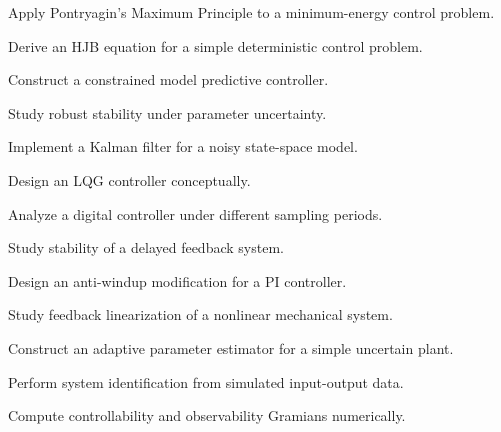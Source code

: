 \begin{exercise}[4]
Apply Pontryagin's Maximum Principle to a minimum-energy control problem.
\end{exercise}

\begin{exercise}[4]
Derive an HJB equation for a simple deterministic control problem.
\end{exercise}

\begin{exercise}[4]
Construct a constrained model predictive controller.
\end{exercise}

\begin{exercise}[4]
Study robust stability under parameter uncertainty.
\end{exercise}

\begin{exercise}[4]
Implement a Kalman filter for a noisy state-space model.
\end{exercise}

\begin{exercise}[4]
Design an LQG controller conceptually.
\end{exercise}

\begin{exercise}[4]
Analyze a digital controller under different sampling periods.
\end{exercise}

\begin{exercise}[4]
Study stability of a delayed feedback system.
\end{exercise}

\begin{exercise}[4]
Design an anti-windup modification for a PI controller.
\end{exercise}

\begin{exercise}[4]
Study feedback linearization of a nonlinear mechanical system.
\end{exercise}

\begin{exercise}[4]
Construct an adaptive parameter estimator for a simple uncertain plant.
\end{exercise}

\begin{exercise}[4]
Perform system identification from simulated input-output data.
\end{exercise}

\begin{exercise}[4]
Compute controllability and observability Gramians numerically.
\end{exercise}


